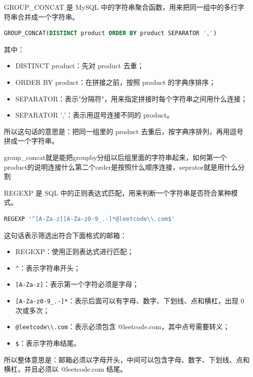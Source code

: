\begin{homework}[1484 | 高级字符串函数 第5题]
\begin{definition}
GROUP\_CONCAT 是 MySQL 中的字符串聚合函数，用来把同一组中的多行字符串合并成一个字符串。

\begin{lstlisting}[language=SQL]
GROUP_CONCAT(DISTINCT product ORDER BY product SEPARATOR ',')
\end{lstlisting}

其中：

\begin{itemize}
  \item DISTINCT product：先对 product 去重；
  \item ORDER BY product：在拼接之前，按照 product 的字典序排序；
  \item SEPARATOR：表示"分隔符"，用来指定拼接时每个字符串之间用什么连接；
  \item SEPARATOR ','：表示用逗号连接不同的 product。
\end{itemize}

所以这句话的意思是：把同一组里的 product 去重后，按字典序排列，再用逗号拼成一个字符串。
\end{definition}
\begin{dxtips}
    group_concat就是能把groupby分组以后组里面的字符串起来，如何第一个product的说明连接什么第二个order是按照什么顺序连接，seprator就是用什么分割
\end{dxtips}
\end{homework}

\begin{homework}[1517 | 高级字符串函数 第7题]
\begin{definition}
REGEXP 是 SQL 中的正则表达式匹配，用来判断一个字符串是否符合某种模式。

\begin{lstlisting}[language=SQL]
REGEXP '^[A-Za-z][A-Za-z0-9_.-]*@leetcode\\.com$'
\end{lstlisting}

这句话表示筛选出符合下面格式的邮箱：

\begin{itemize}
  \item REGEXP：使用正则表达式进行匹配；
  \item \verb|^|：表示字符串开头；
  \item \verb|[A-Za-z]|：表示第一个字符必须是字母；
  \item \verb|[A-Za-z0-9_.-]*|：表示后面可以有字母、数字、下划线、点和横杠，出现 0 次或多次；
  \item \verb|@leetcode\\.com|：表示必须包含 @leetcode.com，其中点号需要转义；
  \item \verb|$|：表示字符串结尾。
\end{itemize}

所以整体意思是：邮箱必须以字母开头，中间可以包含字母、数字、下划线、点和横杠，并且必须以 @leetcode.com 结尾。
\end{definition}
\end{homework}
